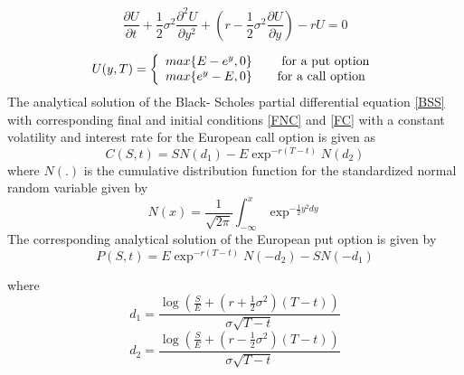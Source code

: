 \documentclass[12pt]{article}
\numberwithin{equation}{section} %
\begin{document}
 \begin{equation}
\frac{\partial U}{\partial
t}+\frac{1}{2}\sigma^2\frac{\partial^2U}{\partial
y^2}+(r-\frac{1}{2}\sigma^2\frac{\partial U}{\partial y})-rU=0
\end{equation}

\[U(y,T) = \left\{
\begin{array}{l l}\label{INC}
  max\{E-e^y,0\} & \quad \mbox{ for a put option}\\
  max\{e^y-E,0\}& \quad \mbox{for a call option}\\ \end{array} \right. \]
The analytical solution of the Black- Scholes partial differential
equation \ref{BSS} with corresponding final and initial conditions
\ref{FNC} and \ref{FC} with a constant volatility and interest rate
 for the European call option is given as\cite{Wilmot}
\begin{equation}
C(S,t)=SN(d_1)-E\exp^{-r(T-t)}N(d_2)
\end{equation}
where $N(.)$ is the cumulative  distribution function for the
standardized normal random variable given by
\begin{equation}
N(x)=\frac{1}{\sqrt{2\pi}}\int^{x}_{-\infty}\exp^{-\frac{1}{2}y^2dy}
\end{equation}
The corresponding analytical solution of the European put option is
given by
\begin{equation}
P(S,t)=E\exp^{-r(T-t)}N(-d_2)-SN(-d_1)
\end{equation}


where\\
\begin{equation*}
d_1=\frac{\log(\frac{S}{E}+(r+\frac{1}{2}\sigma^2)(T-t))}{\sigma\sqrt{T-t}}
\end{equation*}
\begin{equation*}
d_2=\frac{\log(\frac{S}{E}+(r-\frac{1}{2}\sigma^2)(T-t))}{\sigma\sqrt{T-t}}
\end{equation*}
\end{document}
